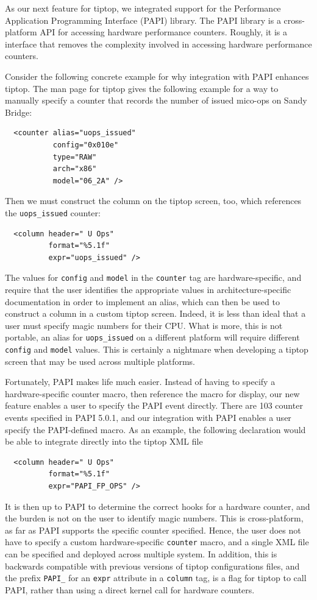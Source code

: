 As our next feature for tiptop, we integrated support for the Performance Application Programming Interface (PAPI) library.
The PAPI library is a cross-platform API for accessing hardware performance counters.
Roughly, it is a interface that removes the complexity involved in accessing hardware performance counters.

Consider the following concrete example for why integration with PAPI enhances tiptop.
The man page for tiptop gives the following example for a way to manually specify a counter that records the number of issued mico-ops on Sandy Bridge:
\begin{verbatim}
  <counter alias="uops_issued"
           config="0x010e"
           type="RAW"
           arch="x86"
           model="06_2A" />
\end{verbatim}
Then we must construct the column on the tiptop screen, too, which references the \texttt{uops\_issued} counter:
\begin{verbatim}
  <column header=" U Ops"
          format="%5.1f"
          expr="uops_issued" />
\end{verbatim}
The values for \texttt{config} and \texttt{model} in the \texttt{counter} tag are hardware-specific, and require that the user identifies the appropriate values in architecture-specific documentation in order to implement an alias, which can then be used to construct a column in a custom tiptop screen.
Indeed, it is less than ideal that a user must specify magic numbers for their CPU.
What is more, this is not portable, an alias for \texttt{uops\_issued} on a different platform will require different \texttt{config} and \texttt{model} values.
This is certainly a nightmare when developing a tiptop screen that may be used across multiple platforms.

Fortunately, PAPI makes life much easier.
Instead of having to specify a hardware-specific counter macro, then reference the macro for display, our new feature enables a user to specify the PAPI event directly.
There are 103 counter events specified in PAPI 5.0.1, and our integration with PAPI enables a user specify the PAPI-defined macro.
As an example, the following declaration would be able to integrate directly into the tiptop XML file
\begin{verbatim}
  <column header=" U Ops"
          format="%5.1f"
          expr="PAPI_FP_OPS" />
\end{verbatim}
It is then up to PAPI to determine the correct hooks for a hardware counter, and the burden is not on the user to identify magic numbers.
This is cross-platform, as far as PAPI supports the specific counter specified.
Hence, the user does not have to specify a custom hardware-specific \texttt{counter} macro, and a single XML file can be specified and deployed across multiple system.
In addition, this is backwards compatible with previous versions of tiptop configurations files, and the prefix \texttt{PAPI\_} for an \texttt{expr} attribute in a \texttt{column} tag, is a flag for tiptop to call PAPI, rather than using a direct kernel call for hardware counters.

